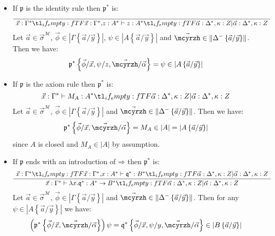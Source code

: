 \documentclass{CSML}
\newcommand*\ifpresent[3]{\tl_if_empty:fTF{#1}{#3}{#2}}
\newcommand*\AXM[1]{\AxiomC{$#1$}}
\newcommand*\UIM[1]{\UnaryInfC{$#1$}}
\newcommand*\DP\DisplayProof
\newcommand*\Entails{\mathrel{\vdash}}
\newcommand*\BarSep{\mathrel{|}}
\newcommand*\Sequent[3]{#1\Entails#2\ifpresent{#3}{\BarSep}{}#3}
\newcommand*\SortA{\sigma}
\newcommand*\LogVarB{y}
\newcommand*\LogNeg[1]{{#1^-}}
\newcommand*\LogImp{\mathbin{\Rightarrow}}
\newcommand*\LogFormA{A}
\newcommand*\LogFormB{B}
\newcommand*\LogProofA{\mathfrak{p}}
\newcommand*\LogProofB{\mathfrak{q}}
\newcommand*\LogSubst[1]{\left\{#1\right\}}
\newcommand*\ModM{\mathcal{M}}
\newcommand*\ModElemA{a}
\newcommand*\ModMInterp[1]{{#1}^\ModM}
\newcommand*\LmSortExtract{Z}
\newcommand*\LmSortTo\to
\newcommand*\LmTerm[2]{#1\mathrel{:}#2}
\newcommand*\LmVarA{x}
\newcommand*\LmVarB{y}
\newcommand*\LmVarC{z}
\newcommand*\LmMVarA\alpha
\newcommand*\LmRuleAxConcl[4]{\Sequent{#1\ifpresent{#1}{,}{}\LmTerm{#3}{#4}}{\LmTerm{#3}{#4}}{#2}}
\newcommand*\LmRuleAx[4]{\AXM{}\UIM{\LmRuleAxConcl{#1}{#2}{#3}{#4}}\DP}
\newcommand*\LmRuleImpIntroFirst[6]{\Sequent{#1\ifpresent{#1}{,}{}\LmTerm{#3}{#4}}{\LmTerm{#5}{#6}}{#2}}
\newcommand*\LmRuleImpIntroConcl[6]{\Sequent{#1}{\LmTerm{\lambda#3.#5}{#4\LmSortTo#6}}{#2}}
\newcommand*\LmRuleImpIntro[6]{\AXM{\LmRuleImpIntroFirst{#1}{#2}{#3}{#4}{#5}{#6}}\UIM{\LmRuleImpIntroConcl{#1}{#2}{#3}{#4}{#5}{#6}}\DP}
\newcommand*\LmInterpForm[1]{{#1}^*}
\newcommand*\LmInterpProof[1]{{#1}^*}
\newcommand*\LmInterpAxiom[1]{M_{#1}}
\newcommand*\CatRCHomA\phi
\newcommand*\CatRCHomB\psi
\newcommand*\CatCHomA\mcyrzh
\newcommand*\RealValNeg[1]{\left\|#1\right\|}
\newcommand*\RealVal[1]{\left|#1\right|}
\begin{document}
\begin{itemize}
\item If $\LogProofA$ is the identity rule then $\LmInterpProof{\LogProofA}$ is:
$$\LmRuleAx{\LmTerm{\vec{\LmVarA}}{\LmInterpForm{\Gamma}}}{\LmTerm{\vec{\LmMVarA}}{\LmInterpForm{\Delta}},\LmTerm{\kappa}{\LmSortExtract}}{\LmVarC}{\LmInterpForm{\LogFormA}}$$
Let $\vec{\ModElemA}\in\ModMInterp{\vec{\SortA}}$, $\vec{\CatRCHomA}\in\RealVal{\Gamma\LogSubst{\vec{\ModElemA}/\vec{\LogVarB}}}$, $\CatRCHomB\in\RealVal{\LogFormA\LogSubst{\vec{\ModElemA}/\vec{\LogVarB}}}$ and $\vec{\CatCHomA}\in\RealValNeg{\LogNeg{\Delta}\LogSubst{\vec{\ModElemA}/\vec{\LogVarB}}}$. Then we have:
$$\LmInterpProof{\LogProofA}\LogSubst{\vec{\CatRCHomA}/\vec{\LmVarA},\CatRCHomB/\LmVarC,\vec{\CatCHomA}/\vec{\LmMVarA}}=\CatRCHomB\in\RealVal{\LogFormA\LogSubst{\vec{\ModElemA}/\vec{\LogVarB}}}$$
\item If $\LogProofA$ is the axiom rule then $\LmInterpProof{\LogProofA}$ is:
$$\Sequent{\LmTerm{\vec{\LmVarA}}{\LmInterpForm{\Gamma}}}{\LmTerm{\LmInterpAxiom{\LogFormA}}{\LmInterpForm{\LogFormA}}}{\LmTerm{\vec{\LmMVarA}}{\LmInterpForm{\Delta}},\LmTerm{\kappa}{\LmSortExtract}}$$
Let $\vec{\ModElemA}\in\ModMInterp{\vec{\SortA}}$, $\vec{\CatRCHomA}\in\RealVal{\Gamma\LogSubst{\vec{\ModElemA}/\vec{\LogVarB}}}$ and $\vec{\CatCHomA}\in\RealValNeg{\LogNeg{\Delta}\LogSubst{\vec{\ModElemA}/\vec{\LogVarB}}}$. Then we have:
$$\LmInterpProof{\LogProofA}\LogSubst{\vec{\CatRCHomA}/\vec{\LmVarA},\vec{\CatCHomA}/\vec{\LmMVarA}}=\LmInterpAxiom{\LogFormA}\in\RealVal{\LogFormA}=\RealVal{\LogFormA\LogSubst{\vec{\ModElemA}/\vec{\LogVarB}}}$$
since $\LogFormA$ is closed and $\LmInterpAxiom{\LogFormA}\in\RealVal{\LogFormA}$ by assumption.
\item If $\LogProofA$ ends with an introduction of $\LogImp$ then $\LmInterpProof{\LogProofA}$ is:
$$\LmRuleImpIntro{\LmTerm{\vec{\LmVarA}}{\LmInterpForm{\Gamma}}}{\LmTerm{\vec{\LmMVarA}}{\LmInterpForm{\Delta}},\LmTerm{\kappa}{\LmSortExtract}}{\LmVarA}{\LmInterpForm{\LogFormA}}{\LmInterpProof{\LogProofB}}{\LmInterpForm{\LogFormB}}$$
Let $\vec{\ModElemA}\in\ModMInterp{\vec{\SortA}}$, $\vec{\CatRCHomA}\in\RealVal{\Gamma\LogSubst{\vec{\ModElemA}/\vec{\LogVarB}}}$ and $\vec{\CatCHomA}\in\RealValNeg{\LogNeg{\Delta}\LogSubst{\vec{\ModElemA}/\vec{\LogVarB}}}$. Then for any $\CatRCHomB\in\RealVal{\LogFormA\LogSubst{\vec{\ModElemA}/\vec{\LogVarB}}}$ we have:
$$\left(\LmInterpProof{\LogProofA}\LogSubst{\vec{\CatRCHomA}/\vec{\LmVarA},\vec{\CatCHomA}/\vec{\LmMVarA}}\right)\CatRCHomB=\LmInterpProof{\LogProofB}\LogSubst{\vec{\CatRCHomA}/\vec{\LmVarA},\CatRCHomB/\LmVarB,\vec{\CatCHomA}/\vec{\LmMVarA}}\in\RealVal{\LogFormB\LogSubst{\vec{\ModElemA}/\vec{\LogVarB}}}$$

\end{itemize}
\end{document}
